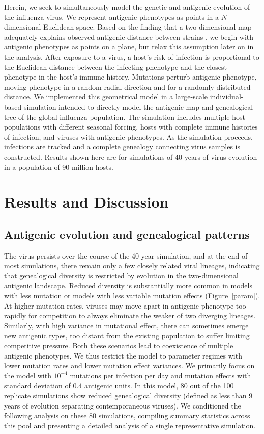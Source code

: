 \documentclass[11pt,oneside,letterpaper]{article}
\begin{document}
Herein, we seek to simultaneously model the genetic and antigenic evolution of the influenza virus.  We represent antigenic phenotypes as points in a $N$-dimensional Euclidean space.  Based on the finding that a two-dimensional map adequately explains observed antigenic distance between strains \cite{Smith04}, we begin with antigenic phenotypes as points on a plane, but relax this assumption later on in the analysis.  After exposure to a virus, a host's risk of infection is proportional to the Euclidean distance between the infecting phenotype and the closest phenotype in the host's immune history.  Mutations perturb antigenic phenotype, moving phenotype in a random radial direction and for a randomly distributed distance.  We implemented this geometrical model in a large-scale individual-based simulation intended to directly model the antigenic map and genealogical tree of the global influenza population.  The simulation includes multiple host populations with different seasonal forcing, hosts with complete immune histories of infection, and viruses with antigenic phenotypes.  As the simulation proceeds, infections are tracked and a complete genealogy connecting virus samples is constructed.  Results shown here are for simulations of 40 years of virus evolution in a population of 90 million hosts.

\section*{Results and Discussion}

\subsection*{Antigenic evolution and genealogical patterns}

The virus persists over the course of the 40-year simulation, and at the end of most simulations, there remain only a few closely related viral lineages, indicating that genealogical diversity is restricted by evolution in the two-dimensional antigenic landscape.  Reduced diversity is substantially more common in models with less mutation or models with less variable mutation effects (Figure~\ref{param}).  At higher mutation rates, viruses may move apart in antigenic phenotype too rapidly for competition to always eliminate the weaker of two diverging lineages.  Similarly, with high variance in mutational effect, there can sometimes emerge new antigenic types, too distant from the existing population to suffer limiting competitive pressure.  Both these scenarios lead to coexistence of multiple antigenic phenotypes.  We thus restrict the model to parameter regimes with lower mutation rates and lower mutation effect variances.  We primarily focus on the model with $10^{-4}$ mutations per infection per day and mutation effects with standard deviation of 0.4 antigenic units.  In this model, 80 out of the 100 replicate simulations show reduced genealogical diversity (defined as less than 9 years of evolution separating contemporaneous viruses).  We conditioned the following analysis on these 80 simulations, compiling summary statistics across this pool and presenting a detailed analysis of a single representative simulation.  
\end{document}

